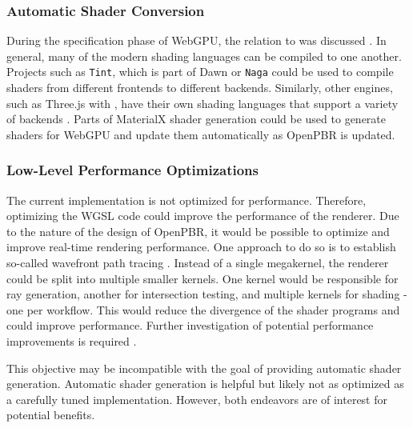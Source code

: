 \subsubsection*{Automatic Shader Conversion}

During the specification phase of \gls{WebGPU}, the relation to  was discussed \cite{webGPUSpirVRelation}. In general, many of the modern shading languages can be compiled to one another. Projects such as \texttt{Tint}, which is part of \gls{Dawn} \cite{dawnImplementation} or \texttt{Naga} \cite{nagaImplementation} could be used to compile shaders from different frontends to different backends. Similarly, other engines, such as \gls{Three.js} with , have their own shading languages that support a variety of backends \cite{ThreeJSShadingLanguage}. Parts of \gls{MaterialX} shader generation could be used to generate shaders for \gls{WebGPU} and update them automatically as \gls{OpenPBR} is updated.

\subsubsection*{Low-Level Performance Optimizations}

The current implementation is not optimized for performance. Therefore, optimizing the \gls{WGSL} code could improve the performance of the renderer. Due to the nature of the design of \gls{OpenPBR}, it would be possible to optimize and improve real-time rendering performance. One approach to do so is to establish so-called wavefront path tracing \cite{laine2013megakernels}. Instead of a single megakernel, the renderer could be split into multiple smaller kernels. One kernel would be responsible for ray generation, another for intersection testing, and multiple kernels for shading - one per workflow. This would reduce the divergence of the shader programs and could improve performance. Further investigation of potential performance improvements is required \cite{wavefrontComparisonInTableA5,mitsubaWavefrontVsMegakernel}.

This objective may be incompatible with the goal of providing automatic shader generation. Automatic shader generation is helpful but likely not as optimized as a carefully tuned implementation. However, both endeavors are of interest for potential benefits.

